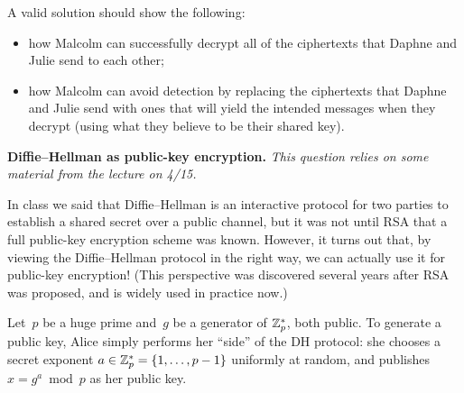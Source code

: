 \documentclass[11pt,addpoints]{exam}
\begin{document}
\begin{questions}
\begin{parts}
\begin{enumerate}
      A valid solution should show the following:
      \begin{itemize}
      \item how Malcolm can successfully decrypt all of the ciphertexts that Daphne and Julie send to each other;
      \item how Malcolm can avoid detection by replacing the ciphertexts that Daphne and Julie send with ones that will yield the intended messages when they decrypt (using what they believe to be their shared key).
      \end{itemize}

      \begin{solution}

      \end{solution}
    \end{enumerate}
  \end{parts}

  \question \textbf{Diffie--Hellman as public-key encryption.} \emph{This question relies on some material from the lecture on 4/15.}

  In class we said that Diffie--Hellman is an interactive protocol for two parties to establish a shared secret over a public channel, but it was not until RSA that a full public-key encryption scheme was known.
  However, it turns out that, by viewing the Diffie--Hellman protocol in the right way, we can actually use it for public-key encryption!
  (This perspective was discovered several years after RSA was proposed, and is widely used in practice now.)

  Let~$p$ be a huge prime and~$g$ be a generator of $\mathbb{Z}_p^*$, both public.
  To generate a public key, Alice simply performs her ``side'' of the DH protocol: she chooses a secret exponent $a \in \mathbb{Z}_p^* = \{1, \ldots, p-1\}$ uniformly at random, and publishes $x = g^a \bmod p$ as her public key.

\end{questions}
\end{document}
